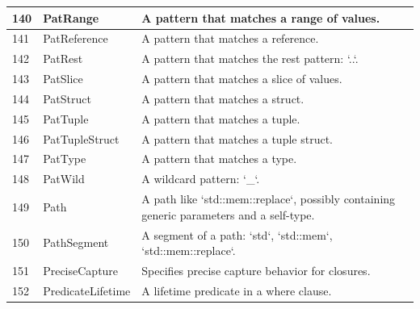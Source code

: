 \begin{longtable}{| p{} | p{} | p{} |}
140   & PatRange                       & A pattern that matches a range of values.                                                                      \\ \hline
141   & PatReference                   & A pattern that matches a reference.                                                                            \\ \hline
142   & PatRest                        & A pattern that matches the rest pattern: `..`.                                                                 \\ \hline
143   & PatSlice                       & A pattern that matches a slice of values.                                                                      \\ \hline
144   & PatStruct                      & A pattern that matches a struct.                                                                               \\ \hline
145   & PatTuple                       & A pattern that matches a tuple.                                                                                \\ \hline
146   & PatTupleStruct                 & A pattern that matches a tuple struct.                                                                         \\ \hline
147   & PatType                        & A pattern that matches a type.                                                                                 \\ \hline
148   & PatWild                        & A wildcard pattern: `\_`.                                                                                       \\ \hline
149   & Path                           & A path like `std::mem::replace`, possibly containing generic parameters and a self-type.                       \\ \hline
150   & PathSegment                    & A segment of a path: `std`, `std::mem`, `std::mem::replace`.                                                   \\ \hline
151   & PreciseCapture                 & Specifies precise capture behavior for closures.                                                               \\ \hline
152   & PredicateLifetime              & A lifetime predicate in a where clause.                                                                        \\ \hline

\end{longtable}
